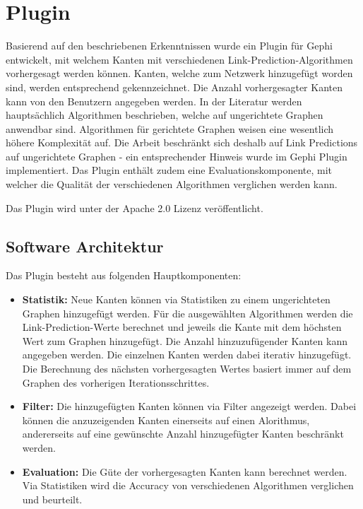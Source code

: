 \chapter{Plugin}

Basierend auf den beschriebenen Erkenntnissen wurde ein Plugin für Gephi entwickelt, mit welchem Kanten mit verschiedenen Link-Prediction-Algorithmen vorhergesagt werden können.
Kanten, welche zum Netzwerk hinzugefügt worden sind, werden entsprechend gekennzeichnet. Die Anzahl vorhergesagter Kanten kann von den Benutzern angegeben werden.
In der Literatur werden hauptsächlich Algorithmen beschrieben, welche auf ungerichtete Graphen anwendbar sind.
Algorithmen für gerichtete Graphen weisen eine wesentlich höhere Komplexität auf. Die Arbeit beschränkt sich deshalb auf Link Predictions auf ungerichtete Graphen -
ein entsprechender Hinweis wurde im Gephi Plugin implementiert. Das Plugin enthält zudem eine Evaluationskomponente, mit welcher die Qualität der verschiedenen Algorithmen verglichen werden kann.

Das Plugin wird unter der Apache 2.0 Lizenz veröffentlicht.

\section{Software Architektur}

Das Plugin besteht aus folgenden Hauptkomponenten:

\begin{itemize}
    \item \textbf{Statistik:} Neue Kanten können via Statistiken zu einem ungerichteten Graphen hinzugefügt werden. Für die ausgewählten Algorithmen werden die Link-Prediction-Werte berechnet und jeweils die Kante mit dem höchsten Wert zum Graphen hinzugefügt. Die Anzahl hinzuzufügender Kanten kann angegeben werden. Die einzelnen Kanten werden dabei iterativ hinzugefügt. Die Berechnung des nächsten vorhergesagten Wertes basiert immer auf dem Graphen des vorherigen Iterationsschrittes.
    \item \textbf{Filter:} Die hinzugefügten Kanten können via Filter angezeigt werden. Dabei können die anzuzeigenden Kanten einerseits auf einen Alorithmus, andererseits auf eine gewünschte Anzahl hinzugefügter Kanten beschränkt werden.
    \item \textbf{Evaluation:} Die Güte der vorhergesagten Kanten kann berechnet werden. Via Statistiken wird die Accuracy von verschiedenen Algorithmen verglichen und beurteilt.
\end{itemize}

